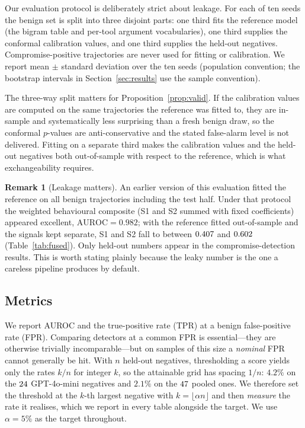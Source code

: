 \documentclass[preprint,12pt,number]{elsarticle}
\theoremstyle{definition}
\newtheorem{remark}{Remark}
\begin{document}
Our evaluation protocol is deliberately strict about leakage. For each of ten
seeds the benign set is split into three disjoint parts: one third fits the
reference model (the bigram table and per-tool argument vocabularies), one third
supplies the conformal calibration values, and one third supplies the held-out
negatives. Compromise-positive trajectories are never used for fitting or
calibration. We report mean $\pm$ standard deviation over the ten seeds (population
convention; the bootstrap intervals in Section~\ref{sec:results} use the sample
convention).

The three-way split matters for Proposition~\ref{prop:valid}. If the calibration
values are computed on the same trajectories the reference was fitted to, they are
in-sample and systematically less surprising than a fresh benign draw, so the
conformal $p$-values are anti-conservative and the stated false-alarm level is not
delivered. Fitting on a separate third makes the calibration values and the
held-out negatives both out-of-sample with respect to the reference, which is what
exchangeability requires.

\begin{remark}[Leakage matters]
An earlier version of this evaluation fitted the reference on all benign
trajectories including the test half. Under that protocol the weighted behavioural
composite (S1 and S2 summed with fixed coefficients) appeared excellent,
$\mathrm{AUROC} = 0.982$; with the reference fitted out-of-sample and the signals
kept separate, S1 and S2 fall to between $0.407$ and $0.602$
(Table~\ref{tab:fused}). Only held-out numbers appear in the compromise-detection
results.
This is worth stating plainly because the leaky number is the one a careless
pipeline produces by default.
\end{remark}

\subsection{Metrics}\label{sec:metrics}

We report AUROC and the true-positive rate (TPR) at a benign false-positive rate
(FPR). Comparing detectors at a common FPR is essential---they are otherwise
trivially incomparable---but on samples of this size a \emph{nominal} FPR cannot
generally be hit. With $n$ held-out negatives, thresholding a score yields only
the rates $k/n$ for integer $k$, so the attainable grid has spacing $1/n$: $4.2\%$
on the $24$ GPT-4o-mini negatives and $2.1\%$ on the $47$ pooled ones. We
therefore set the threshold at the $k$-th largest negative with
$k = \lfloor \alpha n \rfloor$ and then \emph{measure} the rate it realises, which
we report in every table alongside the target. We use $\alpha = 5\%$ as the target
throughout.
\end{document}

